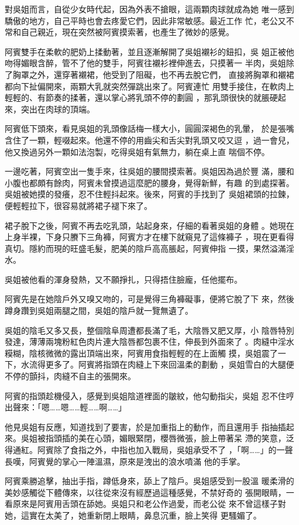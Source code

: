 對吳姐而言，自從少女時代起，因為外表不搶眼，這兩顆肉球就成為她
唯一感到驕傲的地方，自己平時也會去疼愛它們，因此非常敏感。最近工作
忙，老公又不常和自己親近，現在突然被阿賓摸索著，也產生了微妙的感覺。

阿賓雙手在柔軟的肥奶上揉動著，並且逐漸解開了吳姐襯衫的鈕扣，吳
姐正被他吻得媚眼含醉，管不了他的雙手，阿賓往襯衫裡伸進去，只摸著一
半肉，吳姐除了胸罩之外，還穿著襯裙，他受到了阻礙，也不再去脫它們，
直接將胸罩和襯裙都向下扯偏開來，兩顆大乳就突然彈跳出來了。阿賓連忙
用雙手接住，在軟肉上輕輕的、有節奏的揉著，還以掌心將乳頭不停的劃圓
，那乳頭很快的就脹硬起來，突出在肉球的頂端。

阿賓低下頭來，看見吳姐的乳頭像話梅一樣大小，圓圓深褐色的乳暈，
於是張嘴含住了一顆，輕啜起來。他還不停的用齒尖和舌尖對乳頭又咬又逗
，過一會兒，他又換過另外一顆如法泡製，吃得吳姐有氣無力，躺在桌上直
喘個不停。

一邊吃著，阿賓空出一隻手來，往吳姐的腰間摸索著。吳姐因為過於豐
滿，腰和小腹也都頗有餘肉，阿賓未曾摸過這麼肥的腰身，覺得新鮮，有趣
的到處探著。吳姐被她摸的發癢，忍不住輕抖起來。後來，阿賓的手找到了
吳姐裙頭的拉鍊，便輕輕拉下，很容易就將裙子褪下來了。

裙子脫下之後，阿賓不再去吃乳頭，站起身來，仔細的看著吳姐的身體
。她現在上身半裸，下身只賸下三角褲，阿賓方才在樓下就窺見了這條褲子
，現在更看得真切。隱約而現的旺盛毛髮，肥美的陰戶高高脹起，阿賓伸指
一摸，果然溢滿淫水。

吳姐被他看的渾身發熱，又不願掙扎，只得捂住臉龐，任他擺布。

阿賓先是在她陰戶外又嗅又吻的，可是覺得三角褲礙事，便將它脫了下
來，然後蹲身躦到吳姐兩腿之間，吳姐的陰戶就一覽無遺了。

吳姐的陰毛又多又長，整個陰阜周遭都長滿了毛，大陰唇又肥又厚，小
陰唇特別發達，薄薄兩塊粉紅色肉片連大陰唇都包裹不住，伸長到外面來了
。肉縫中淫水糢糊，陰核微微的露出頂端出來，阿賓用食指輕輕的在上面觸
摸，吳姐震了一下，水流得更多了。阿賓將指頭在肉縫上下來回溫柔的劃動
，吳姐雪白的大腿便不停的顫抖，肉縫不自主的張開來。

阿賓的指頭趁機侵入，感覺到吳姐陰道裡面的皺紋，他勾動指尖，吳姐
忍不住哼出聲來：「嗯……嗯……輕……啊……」

他見吳姐有反應，知道找到了要害，於是加重指上的動作，而且還用手
指抽插起來。吳姐被指頭插的美在心頭，媚眼緊閉，櫻唇微張，臉上帶著呆
滯的笑意，泛得通紅。阿賓除了食指之外，中指也加入戰局，吳姐承受不了
，「啊……」的一聲長嘆，阿賓覺的掌心一陣溫濕，原來是洩出的浪水噴滿
他的手掌。

阿賓乘勝追擊，抽出手指，蹲低身來，舔上了陰戶。吳姐感受到一股溫
暖柔滑的美妙感觸從下體傳來，以往從來沒有經歷過這種感覺，不禁好奇的
張開眼睛，一看原來是阿賓用舌頭在舔她。吳姐只和老公作過愛，而老公從
來不曾這樣子對她，這實在太美了，她重新閉上眼睛，鼻息沉重，臉上笑得
更騷媚了。

